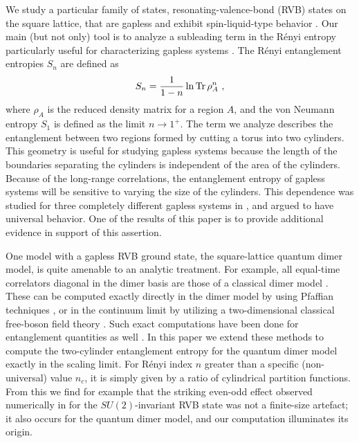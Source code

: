\documentclass[11pt]{iopart}
\begin{document}
We study a particular family of states, resonating-valence-bond (RVB) states on the square lattice, that are gapless and exhibit spin-liquid-type behavior \cite{RokhsarKivelson,RVB1,RVB2}. Our main (but not only) tool is to analyze a subleading term in the R\'enyi entropy particularly useful for characterizing gapless systems \cite{Ju2012}. The R\'enyi entanglement entropies $S_n$ are defined as
\begin{equation}
S_n=\frac{1}{1-n} \ln {\rm Tr}\, \rho_A^n\ , \label{RenyiEq}
\end{equation}
where $\rho_A$ is the reduced density matrix for a region $A$, and the von Neumann entropy $S_1$ is defined as the limit $n\to 1^+$.
The term we analyze describes the entanglement between two regions formed by cutting a torus into two cylinders. This geometry is useful for studying gapless systems
because the length of the boundaries separating the cylinders is independent of the area of the cylinders. Because of the long-range correlations, the entanglement
entropy of gapless systems will be sensitive to varying the size of the cylinders. 
This dependence was studied for three completely different gapless systems in \cite{Ju2012}, and argued to have universal behavior. One of the results of this paper is to provide additional evidence in support of this assertion.

One model with a gapless RVB ground state, the square-lattice quantum dimer model, is quite amenable to an analytic treatment. For example, all equal-time correlators diagonal in the dimer basis are those of a classical dimer model \cite{RokhsarKivelson}. These can be computed exactly directly in the dimer model by using Pfaffian techniques \cite{Kasteleyn,Fisher,FisherStephenson}, or in the continuum limit by utilizing a two-dimensional classical free-boson field theory \cite{Fradkinbook,Henley}. Such exact computations have been done for entanglement quantities as well \cite{FradkinMoore,Hsu2009,Shannonee,Oshikawa,Zaletel,Stephan2011}. In this paper we extend these methods to compute the two-cylinder entanglement entropy for the quantum dimer model exactly in the scaling limit. For R\'enyi index $n$ greater than a specific (non-universal) value $n_c$, it is simply given by a ratio of cylindrical partition functions. From this we find for example that the striking even-odd effect 
observed numerically in \cite{Ju2012} for 
the $SU(2)$-invariant RVB state was not a finite-size artefact; it also occurs for the quantum dimer model, and our computation illuminates its origin.
\end{document}

